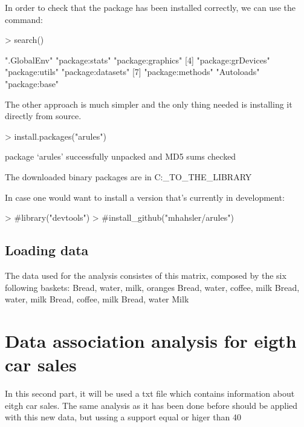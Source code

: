 \documentclass[a4paper]{article}
\begin{document}
\begin{Schunk}
In order to check that the package has been installed correctly, we can use the command:
\begin{Schunk}
\begin{Sinput}
> search()
\end{Sinput}
\begin{Soutput}
[1] ".GlobalEnv"        "package:stats"     "package:graphics" 
[4] "package:grDevices" "package:utils"     "package:datasets" 
[7] "package:methods"   "Autoloads"         "package:base"     
\end{Soutput}
\end{Schunk}


The other approach is much simpler and the only thing needed is installing it
directly from source.

\begin{Schunk}
\begin{Sinput}
> install.packages("arules")
\end{Sinput}
\begin{Soutput}
package ‘arules’ successfully unpacked and MD5 sums checked

The downloaded binary packages are in
	C:\Users\PATH_TO_THE_LIBRARY
\end{Soutput}
\end{Schunk}

In case one would want to install a version that's currently in development:
\begin{Schunk}
\begin{Sinput}
> #library("devtools")
> #install_github("mhahsler/arules")
\end{Sinput}
\end{Schunk}


\subsection*{Loading data}

The data used for the analysis consistes of this matrix, composed by the six
following baskets:
{Bread, water,  milk,   oranges}
{Bread, water,  coffee, milk}
{Bread, water,  milk}
{Bread, coffee, milk}
{Bread, water}
{Milk}




\section*{Data association analysis for eigth car sales}
In this second part, it will be used a txt file which contains information about eitgh car sales.
The same analysis as it has been done before should be applied with this new data, but ussing a support
equal or higer than 40%



\end{Schunk}
\end{document}

